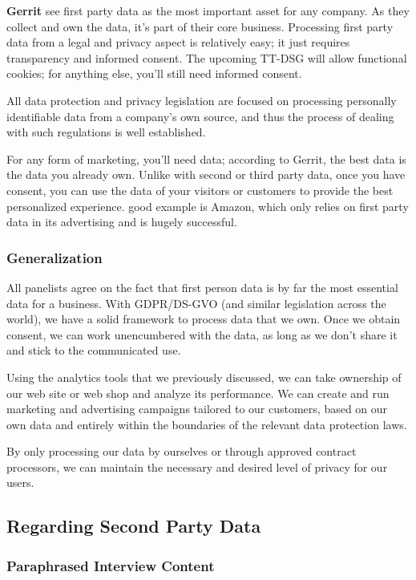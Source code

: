 \textbf{Gerrit} see first party data as the most important asset for any company. As they collect and own the data, it's part of their core business. Processing first party data from a legal and privacy aspect is relatively easy; it just requires transparency and informed consent. The upcoming TT-DSG will allow functional cookies; for anything else, you'll still need informed consent. 

All data protection and privacy legislation are focused on processing personally identifiable data from a company's own source, and thus the process of dealing with such regulations is well established.

For any form of marketing, you'll need data; according to Gerrit, the best data is the data you already own. Unlike with second or third party data, once you have consent, you can use the data of your visitors or customers to provide the best personalized experience.  good example is Amazon, which only relies on first party data in its advertising and is hugely successful.

\subsubsection{Generalization}

All panelists agree on the fact that first person data is by far the most essential data for a business. With GDPR/DS-GVO (and similar legislation across the world), we have a solid framework to process data that we own. Once we obtain consent, we can work unencumbered with the data, as long as we don't share it and stick to the communicated use.

Using the analytics tools that we previously discussed, we can take ownership of our web site or web shop and analyze its performance. We can create and run marketing and advertising campaigns tailored to our customers, based on our own data and entirely within the boundaries of the relevant data protection laws.

By only processing our data by ourselves or through approved contract processors, we can maintain the necessary and desired level of privacy for our users.

\subsection{Regarding Second Party Data}

\subsubsection{Paraphrased Interview Content}

